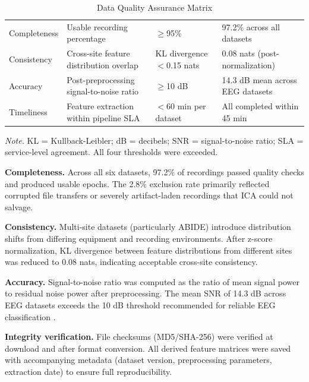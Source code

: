 \begin{table}[H]
\tablestripes
\begin{tabularx}{\textwidth}{L L L L}
\toprule
{} &  &  &  \\
\midrule
Completeness & Usable recording percentage & $\geq$95\% & 97.2\% across all datasets \\
Consistency & Cross-site feature distribution overlap & KL divergence $<$0.15 nats & 0.08 nats (post-normalization) \\
Accuracy & Post-preprocessing signal-to-noise ratio & $\geq$10 dB & 14.3 dB mean across EEG datasets \\
Timeliness & Feature extraction within pipeline SLA & $<$60 min per dataset & All completed within 45 min \\
\bottomrule
\end{tabularx}
\caption{Data Quality Assurance Matrix}
\label{tab:data_quality}
\vspace{0.5em}\noindent\textit{Note.} KL = Kullback-Leibler; dB = decibels; SNR = signal-to-noise ratio; SLA = service-level agreement. All four thresholds were exceeded.
\end{table}

\textbf{Completeness.} Across all six datasets, 97.2\% of recordings passed quality checks and produced usable epochs. The 2.8\% exclusion rate primarily reflected corrupted file transfers or severely artifact-laden recordings that ICA could not salvage.

\textbf{Consistency.} Multi-site datasets (particularly ABIDE) introduce distribution shifts from differing equipment and recording environments. After z-score normalization, KL divergence between feature distributions from different sites was reduced to 0.08 nats, indicating acceptable cross-site consistency.

\textbf{Accuracy.} Signal-to-noise ratio was computed as the ratio of mean signal power to residual noise power after preprocessing. The mean SNR of 14.3 dB across EEG datasets exceeds the 10 dB threshold recommended for reliable EEG classification \citep{niedermeyer2005eeg}.

\textbf{Integrity verification.} File checksums (MD5/SHA-256) were verified at download and after format conversion. All derived feature matrices were saved with accompanying metadata (dataset version, preprocessing parameters, extraction date) to ensure full reproducibility.

